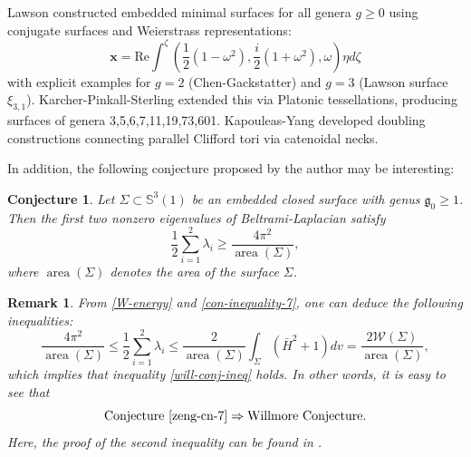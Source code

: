 \documentclass[a4, 12pt]{amsart}
\numberwithin{equation}{section} \numberwithin{equation}{section}
\newtheorem{rem}{Remark}[section]{\bfseries\upshape}
\newtheorem{con}[thm]{Conjecture}
\begin{document}
Lawson \cite{Law2} constructed embedded minimal surfaces for all genera $g \geq 0$ using conjugate surfaces and Weierstrass representations:
\begin{equation*}
\mathbf{x} = \text{Re} \int^{\zeta} \left( \frac{1}{2}(1-\omega^2), \frac{i}{2}(1 + \omega^2), \omega \right) \eta d\zeta
\end{equation*}
with explicit examples for $g=2$ (Chen-Gackstatter) and $g=3$ (Lawson surface $\xi_{3,1}$). Karcher-Pinkall-Sterling \cite{KPS} extended this via Platonic tessellations, producing surfaces of genera 3,5,6,7,11,19,73,601. Kapouleas-Yang \cite{KY} developed doubling constructions connecting parallel Clifford tori via catenoidal necks.










In addition, the following conjecture proposed by the author may be interesting:


\begin{con} \label{zeng-cn-7}Let $\Sigma \subset \mathbb{S}^{3}(1)$ be an embedded closed surface with  genus  $\mathfrak{g}_{0}\geq 1$. Then the first two nonzero eigenvalues of Beltrami-Laplacian satisfy
\begin{equation}\label{con-inequality-7}
\frac{1}{2} \sum_{i=1}^{2}  \lambda_{i} \geq \frac{4 \pi^2}{\operatorname{area}\left(\Sigma\right)},
\end{equation}where $\operatorname{area}\left(\Sigma\right)$ denotes the area of the surface $\Sigma$.\end{con}
\begin{rem} From  \eqref{W-energy} and \eqref{con-inequality-7}, one can  deduce the following inequalities:
\begin{equation*}
\frac{4 \pi^2}{\operatorname{area}\left(\Sigma\right)} \leq \frac{1}{2} \sum_{i=1}^2  \lambda_i \leq \frac{2}{\operatorname{area}\left(\Sigma\right)} \int_{\Sigma}\left(\bar{H}^2+1\right) d v=\frac{2 \mathcal{W}\left(\Sigma\right)}{\operatorname{area}\left(\Sigma\right)},
\end{equation*}
which implies that inequality \eqref{will-conj-ineq} holds. In other words, it is easy to see that \begin{equation*} \text{Conjecture } {\rm \ref{zeng-cn-7}}   \Rightarrow  \text{Willmore Conjecture}.\end{equation*} Here, the proof of the second inequality can be found in {\rm \cite[Corollary 2.6]{IM}}.
\end{rem}
\end{document}
